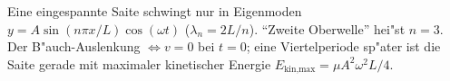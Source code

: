\begin{merksatz}
Eine eingespannte Saite schwingt nur in Eigenmoden $y=A\sin(n\pi x/L)\cos(\omega t)$
($\lambda_n=2L/n$). ``Zweite Oberwelle'' hei"st $n=3$. Der B"auch-Auslenkung
$\Leftrightarrow v=0$ bei $t=0$; eine Viertelperiode sp"ater ist die Saite
gerade mit maximaler kinetischer Energie $E_{\text{kin,max}}=\mu A^2\omega^2L/4$.
\end{merksatz}
